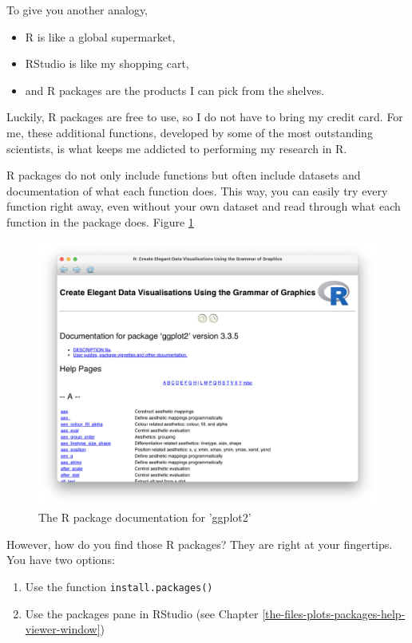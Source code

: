 \documentclass[
]{book}
\begin{document}
To give you another analogy,

\begin{itemize}
\item
  R is like a global supermarket,
\item
  RStudio is like my shopping cart,
\item
  and R packages are the products I can pick from the shelves.
\end{itemize}

Luckily, R packages are free to use, so I do not have to bring my credit card. For me, these additional functions, developed by some of the most outstanding scientists, is what keeps me addicted to performing my research in R.

R packages do not only include functions but often include datasets and documentation of what each function does. This way, you can easily try every function right away, even without your own dataset and read through what each function in the package does. Figure \ref{fig:img-r-package-documentation}

\begin{figure}
\includegraphics[width=28.08in]{images/chapter_05_img/r_package_documentation} \caption{The R package documentation for 'ggplot2'}\label{fig:img-r-package-documentation}
\end{figure}

However, how do you find those R packages? They are right at your fingertips. You have two options:

\begin{enumerate}
\def\labelenumi{\arabic{enumi}.}
\item
  Use the function \texttt{install.packages()}
\item
  Use the packages pane in RStudio (see Chapter \ref{the-files-plots-packages-help-viewer-window})
\end{enumerate}
\end{document}
